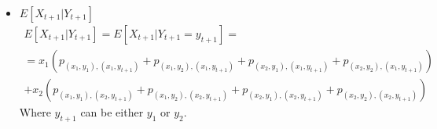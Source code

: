 \begin{itemize}
    \item $E[X_{t+1}|Y_{t+1}]$
    \begin{gather*}
        E[X_{t+1}|Y_{t+1}] = E[X_{t+1}|Y_{t+1}=y_{t+1}]=\\
        = x_{1}(p_{(x_{1},y_{1}),(x_{1},y_{t+1})}+p_{(x_{1},y_{2}),(x_{1},y_{t+1})}+p_{(x_{2},y_{1}),(x_{1},y_{t+1})}+p_{(x_{2},y_{2}),(x_{1},y_{t+1})})\\
        + x_{2}(p_{(x_{1},y_{1}),(x_{2},y_{t+1})}+p_{(x_{1},y_{2}),(x_{2},y_{t+1})}+p_{(x_{2},y_{1}),(x_{2},y_{t+1})}+p_{(x_{2},y_{2}),(x_{2},y_{t+1})})        
    \end{gather*}
    Where $y_{t+1}$ can be either $y_{1}$ or $y_{2}$.
    


\end{itemize}
